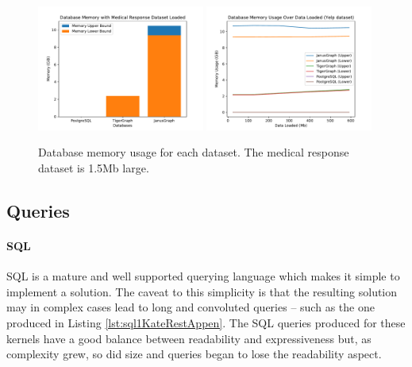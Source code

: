 
\begin{figure}[h]
    \centering
    \includegraphics[width=0.49\textwidth]{img/7_memoryResults/simMemory.pdf}
    \includegraphics[width=0.49\textwidth]{img/7_memoryResults/yelpMemory.pdf}
    \caption{Database memory usage for each dataset. The medical response dataset is 1.5Mb large.}
    \label{fig:memoryResults}
\end{figure}

\subsection{Queries}

\paragraph{SQL}

SQL is a mature and well supported querying language which makes it simple to implement a solution. The caveat to this simplicity is that the resulting solution may in complex cases lead to long and convoluted queries -- such as the one produced in Listing \ref{lst:sql1KateRestAppen}. The SQL queries produced for these kernels have a good balance between readability and expressiveness but, as complexity grew, so did size and queries began to lose the readability aspect.

